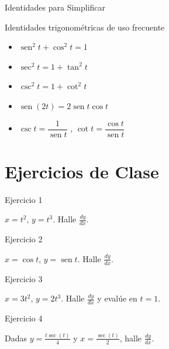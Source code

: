 \documentclass[aspectratio=169]{beamer}
\begin{document}
\begin{frame}{Identidades para Simplificar}
  \begin{block}{Identidades trigonométricas de uso frecuente}
    \begin{itemize}
      \item $\operatorname{sen}^2 t + \cos^2 t = 1$
      \item $\sec^2 t = 1 + \tan^2 t$
      \item $\csc^2 t = 1 + \cot^2 t$
      \item $\operatorname{sen}(2t) = 2\operatorname{sen} t\cos t$
      \item $\csc t = \dfrac{1}{\operatorname{sen} t}$ \quad, \quad $\cot t = \dfrac{\cos t}{\operatorname{sen} t}$
    \end{itemize}
  \end{block}
\end{frame}

\section{Ejercicios de Clase}

\begin{frame}{Ejercicio 1}
  \begin{mwejercicio}
    $x = t^2$, $y = t^3$. Halle $\frac{dy}{dx}$.
  \end{mwejercicio}
\end{frame}

\begin{frame}{Ejercicio 2}
  \begin{mwejercicio}
    $x = \cos t$, $y = \operatorname{sen} t$. Halle $\frac{dy}{dx}$.
  \end{mwejercicio}
\end{frame}

\begin{frame}{Ejercicio 3}
  \begin{mwejercicio}
    $x = 3t^2$, $y = 2t^3$. Halle $\frac{dy}{dx}$ y evalúe en $t = 1$.
  \end{mwejercicio}
\end{frame}

\begin{frame}{Ejercicio 4}
  \begin{mwejercicio}
    Dadas $y = \frac{t\sec(t)}{4}$ y $x = \frac{\sec(t)}{2}$, halle $\frac{dy}{dx}$.
  \end{mwejercicio}
\end{frame}
\end{document}
